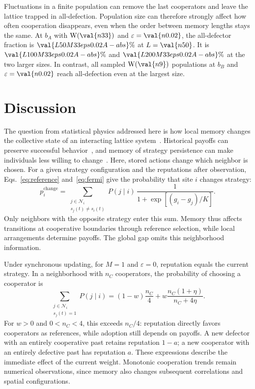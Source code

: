\documentclass[physics,article,submit,moreauthors]{Definitions/mdpi}
\newcommand{\W}{\mathrm{W}}
\begin{document}
Fluctuations in a finite population can remove the last cooperators and leave the lattice trapped in all-defection. Population size can therefore strongly affect how often cooperation disappears, even when the order between memory lengths stays the same. At $b_A$ with $\W(\val{n33})$ and $\varepsilon=\val{n0.02}$, the all-defector fraction is $\val{L50M33eps0.02A-abs}\%$ at $L=\val{n50}$. It is $\val{L100M33eps0.02A-abs}\%$ and $\val{L200M33eps0.02A-abs}\%$ at the two larger sizes. In contrast, all sampled $\W(\val{n9})$ populations at $b_B$ and $\varepsilon=\val{n0.02}$ reach all-defection even at the largest size.

\section{Discussion}\label{sec:discussion}
The question from statistical physics addressed here is how local memory changes the collective state of an interacting lattice system~\cite{szabo2007,perc2017}. Historical payoffs can preserve successful behavior~\cite{shu2019}, and memory of strategy persistence can make individuals less willing to change~\cite{xu2024}. Here, stored actions change which neighbor is chosen. For a given strategy configuration and the reputations after observation, Eqs.~\eqref{eq:reference} and~\eqref{eq:fermi} give the probability that site $i$ changes strategy:
\[
 p_i^{\mathrm{change}}=
 \sum_{\substack{j\in\mathcal N_i\\s_j(t)\ne s_i(t)}}
 P(j\mid i)\,\frac{1}{1+\exp[(g_i-g_j)/K]}.
\]
Only neighbors with the opposite strategy enter this sum. Memory thus affects transitions at cooperative boundaries through reference selection, while local arrangements determine payoffs. The global gap omits this neighborhood information.

Under synchronous updating, for $M=1$ and $\varepsilon=0$, reputation equals the current strategy. In a neighborhood with $n_C$ cooperators, the probability of choosing a cooperator is
\[
 \sum_{\substack{j\in\mathcal N_i\\s_j(t)=1}}P(j\mid i)
 =(1-w)\frac{n_C}{4}+w\frac{n_C(1+\eta)}{n_C+4\eta}.
\]
For $w>0$ and $0<n_C<4$, this exceeds $n_C/4$: reputation directly favors cooperators as references, while adoption still depends on payoffs. A new defector with an entirely cooperative past retains reputation $1-a$; a new cooperator with an entirely defective past has reputation $a$. These expressions describe the immediate effect of the current weight. Monotonic cooperation trends remain numerical observations, since memory also changes subsequent correlations and spatial configurations.
\end{document}
